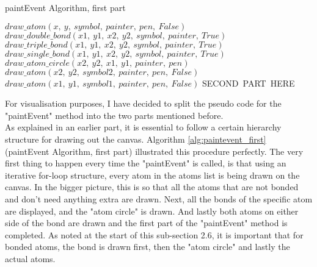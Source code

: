 \documentclass[a4paper,12pt]{article}
\begin{document}
\begin{algorithm}
\footnotesize
\caption{paintEvent Algorithm, first part}\label{alg:paintevent_first}
\begin{algorithmic}
	\State $ draw\_atom(x,\ y,\ symbol,\ painter,\ pen,\ False)$
			\State $ draw\_double\_bond(x1,\ y1,\ x2,\ y2,\ symbol,\ painter,\ True)$
			\State $ draw\_triple\_bond(x1,\ y1,\ x2,\ y2,\ symbol,\ painter,\ True)$
		\Else
			\State $ draw\_single\_bond(x1,\ y1,\ x2,\ y2,\ symbol,\ painter,\ True)$
		\EndIf
		\State $ draw\_atom\_circle(x2,\ y2,\ x1,\ y1,\ painter,\ pen)$
		\State $ draw\_atom(x2,\ y2,\ symbol2,\ painter,\ pen,\ False)$
		\State $ draw\_atom(x1,\ y1,\ symbol1,\ painter,\ pen,\ False)$
	\EndFor
\EndFor
\State SECOND\ PART\ HERE
\EndFunction
\end{algorithmic}
\end{algorithm}

For visualisation purposes, I have decided to split the pseudo code for the "paintEvent" method into the two parts mentioned before.\\
As explained in an earlier part, it is essential to follow a certain hierarchy structure for drawing out the canvas. Algorithm \ref{alg:paintevent_first} (paintEvent Algorithm, first part) illustrated this procedure perfectly. The very first thing to happen every time the "paintEvent" is called, is that using an iterative for-loop structure, every atom in the atoms list is being drawn on the canvas. In the bigger picture, this is so that all the atoms that are not bonded and don't need anything extra are drawn. Next, all the bonds of the specific atom are displayed, and the "atom circle" is drawn. And lastly both atoms on either side of the bond are drawn and the first part of the "paintEvent" method is completed. As noted at the start of this sub-section 2.6, it is important that for bonded atoms, the bond is drawn first, then the "atom circle" and lastly the actual atoms.

\newpage
\end{document}
